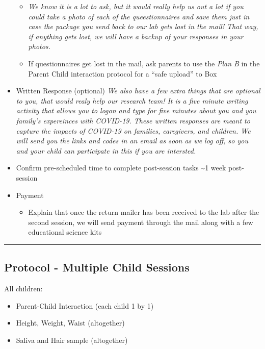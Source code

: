 \documentclass[]{book}
\providecommand{\tightlist}{%
  \setlength{\itemsep}{0pt}\setlength{\parskip}{0pt}}
\begin{document}
\begin{itemize}
  \begin{itemize}
  \tightlist
  \item
    \emph{We know it is a lot to ask, but it would really help us out a lot if you could take a photo of each of the queestionnaires and save them just in case the package you send back to our lab gets lost in the mail! That way, if anything gets lost, we will have a backup of your responses in your photos.}
  \item
    If questionnaires get lost in the mail, ask parents to use the \emph{Plan B} in the Parent Child interaction protocol for a ``safe upload'' to Box
  \end{itemize}
\item
  Written Response (optional)
  \emph{We also have a few extra things that are optional to you, that would realy help our research team! It is a five minute writing activity that allows you to logon and type for five minutes about you and you family's expereinces with COVID-19. These written responses are meant to capture the impacts of COVID-19 on families, caregivers, and children. We will send you the links and codes in an email as soon as we log off, so you and your child can participate in this if you are intersted.}
\item
  Confirm pre-scheduled time to complete post-session tasks \textasciitilde{}1 week post-session
\item
  Payment

  \begin{itemize}
  \tightlist
  \item
    Explain that once the return mailer has been received to the lab after the second session, we will send payment through the mail along with a few educational science kits
  \end{itemize}
\end{itemize}

\begin{center}\rule{0.5\linewidth}{0.5pt}\end{center}

\hypertarget{protocol---multiple-child-sessions}{%
\subsection{Protocol - Multiple Child Sessions}\label{protocol---multiple-child-sessions}}

All children:

\begin{itemize}
\tightlist
\item
  Parent-Child Interaction (each child 1 by 1)
\item
  Height, Weight, Waist (altogether)
\item
  Saliva and Hair sample (altogether)
\end{itemize}
\end{document}
